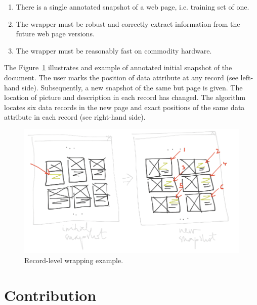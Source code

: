 \begin{enumerate}
	\item There is a single annotated snapshot of a web page, i.e. training set of one.
	\item The wrapper must be robust and correctly extract information from the future web page versions.
	\item The wrapper must be reasonably fast on commodity hardware.
\end{enumerate}


The Figure~\ref{fig:record-level-wrapping} illustrates and example of annotated initial snapshot of the document. The user marks the position of data attribute at any record (see left-hand side). Subsequently, a new snapshot of the same but page is given. The location of picture and description in each record has changed. The algorithm locates six data records in the new page and exact positions of the same data attribute in each record (see right-hand side).

\begin{figure}[h]
	\centering
	\includegraphics[width=1\linewidth]{figures/record-level-wrapping}
	\caption{Record-level wrapping example.}
	\label{fig:record-level-wrapping}
\end{figure}


\section{Contribution}


